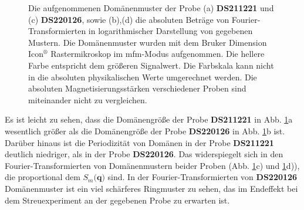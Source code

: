 \begin{figure}[H]
    \centering
    
    \caption{Die aufgenommenen Domänenmuster der Probe (a) \textbf{DS211221} und (c) \textbf{DS220126}, sowie (b),(d) die absoluten Beträge von Fourier-Transformierten in logarithmischer Darstellung von gegebenen Mustern. Die Domänenmuster wurden mit dem Bruker Dimension Icon$^{\text{®}}$ Rastermikroskop im \gls{mfm}-Modus aufgenommen. Die hellere Farbe entspricht dem größeren Signalwert. Die Farbskala kann nicht in die absoluten physikalischen Werte umgerechnet werden. Die absoluten Magnetisierungsstärken verschiedener Proben sind miteinander nicht zu vergleichen.}
    \label{fig:mfm-amplitude-ft}
\end{figure}
\noindent
Es ist leicht zu sehen, dass die Domänengröße der Probe \textbf{DS211221} in Abb. \ref{fig:mfm-amplitude-ft}a wesentlich größer als die Domänengröße der Probe \textbf{DS220126} in Abb. \ref{fig:mfm-amplitude-ft}b ist. Darüber hinaus ist die Periodizität von Domänen in der Probe \textbf{DS211221} deutlich niedriger, als in der Probe  \textbf{DS220126}. Das widerspiegelt sich in den Fourier-Transformierten von Domänenmustern beider Proben (Abb. \ref{fig:mfm-amplitude-ft}c) und \ref{fig:mfm-amplitude-ft}d)), die proportional dem $S_m(\mathbf{q)}$ sind. In der Fourier-Transformierten von \textbf{DS220126} Domänenmuster ist ein viel schärferes Ringmuster zu sehen, das im Endeffekt bei dem Streuexperiment an der gegebenen Probe zu erwarten ist.

